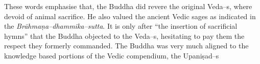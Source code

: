 These words emphasise that, the Buddha did revere the original Veda–s, where devoid of animal sacrifice. He also valued the ancient Vedic sages as indicated in the \textit{Brāhmaṇa–dhammika–sutta}. It is only after “the insertion of sacrificial hymns” that the Buddha objected to the Veda–s, hesitating to pay them the respect they formerly commanded. The Buddha was very much aligned to the knowledge based portions of the Vedic compendium, the Upaniṣad–s
